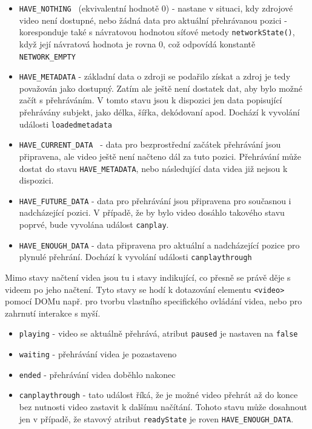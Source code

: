 \begin{itemize}
	\item \texttt{HAVE\_NOTHING } (ekvivalentní hodnotě 0) \newline
	 - nastane v situaci, kdy zdrojové video není dostupné, nebo žádná data pro aktuální přehrávanou pozici \newline - koresponduje také s návratovou hodnotou síťové metody \texttt{networkState()}, když její návratová hodnota je rovna 0, což odpovídá konstantě \texttt{NETWORK\_EMPTY}
	\item \texttt{HAVE\_METADATA} \newline
		-  základní data o zdroji se podařilo získat a zdroj je tedy považován jako dostupný. Zatím ale ještě není dostatek dat, aby bylo možné začít s přehráváním. V tomto stavu jsou k dispozici jen data popisující přehrávány subjekt, jako délka, šířka, dekódovaní apod. Dochází k vyvolání události \texttt{loadedmetadata}
	\item \texttt{HAVE\_CURRENT\_DATA }\newline
		- data pro bezprostřední začátek přehrávání jsou připravena, ale video ještě není načteno dál za tuto pozici. Přehrávání může dostat do stavu \texttt{HAVE\_METADATA}, nebo následující data videa již nejsou k dispozici.
	\item \texttt{HAVE\_FUTURE\_DATA}\newline
		- data pro přehrávání jsou připravena pro současnou i nadcházející pozici. V případě, že by bylo video dosáhlo takového stavu poprvé, bude vyvolána událost \texttt{canplay}.
	\item \texttt{HAVE\_ENOUGH\_DATA}\newline
		- data připravena pro aktuální a nadcházející pozice pro plynulé přehrání. Dochází k vyvolání události \texttt{canplaythrough}
\end{itemize}

Mimo stavy načtení videa jsou tu i stavy indikující, co přesně se právě děje s videem po jeho načtení. Tyto stavy se hodí k dotazování elementu \texttt{<video>} pomocí DOMu např. pro tvorbu vlastního specifického ovládání videa, nebo pro zahrnutí interakce s myší.



\begin{itemize}
	\item \texttt{playing} - video se aktuálně přehrává, atribut \texttt{paused} je nastaven na \texttt{false}	
	\item \texttt{waiting} - přehrávání videa je pozastaveno	
	\item \texttt{ended} - přehrávání videa doběhlo nakonec
	\item \texttt{canplaythrough} - tato událost říká, že je možné video přehrát až do konce bez nutnosti video zastavit k dalšímu načítání. Tohoto stavu může dosahnout jen v případě, že stavový atribut \texttt{readyState} je roven \texttt{HAVE\_ENOUGH\_DATA}.
	
\end{itemize}

